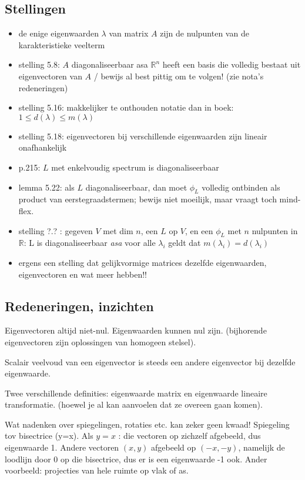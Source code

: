 \documentclass{article}
\begin{document}
\subsection{Stellingen}
\begin{itemize}
    \item de enige eigenwaarden $\lambda$ van matrix $A$ zijn de nulpunten van de karakteristieke veelterm
    \item stelling 5.8: $A$ diagonaliseerbaar asa $\mathbb{R}^n$ heeft een basis die volledig bestaat uit eigenvectoren van $A$ / bewijs al best pittig om te volgen! (zie nota's redeneringen) 
    \item stelling 5.16: makkelijker te onthouden notatie dan in boek:   $1 \leq d(\lambda) \leq m(\lambda)$
    \item stelling 5.18: eigenvectoren bij verschillende eigenwaarden zijn lineair onafhankelijk 
    \item p.215: $L$ met enkelvoudig spectrum is diagonaliseerbaar
    \item lemma 5.22: als $L$ diagonaliseerbaar, dan moet $\phi_L$ volledig ontbinden als product van eerstegraadstermen; bewijs niet moeilijk, maar vraagt toch mind-flex. 
    \item stelling ?.? : gegeven $V$ met dim $n$, een $L$ op $V$, en een $\phi_L$ met $n$ nulpunten in $\mathbb{R}$: L is diagonaliseerbaar \emph{asa} voor alle $\lambda_i$ geldt dat $m(\lambda_i) = d(\lambda_i) $
    \item ergens een stelling dat gelijkvormige matrices dezelfde eigenwaarden, eigenvectoren en wat meer hebben!! 
\end{itemize}

\subsection{Redeneringen, inzichten}

Eigenvectoren altijd niet-nul. Eigenwaarden kunnen nul zijn. (bijhorende eigenvectoren zijn oplossingen van homogeen stelsel). 

Scalair veelvoud van een eigenvector is steeds een andere eigenvector bij dezelfde eigenwaarde. 

Twee verschillende definities: eigenwaarde matrix en eigenwaarde lineaire transformatie. (hoewel je al kan aanvoelen dat ze overeen gaan komen). 

Wat nadenken over spiegelingen, rotaties etc. kan zeker geen kwaad! Spiegeling tov bisectrice (y=x). Als $y=x$ : die vectoren op zichzelf afgebeeld, dus eigenwaarde 1. Andere vectoren $(x,y)$ afgebeeld op $(-x,-y)$, namelijk de loodlijn door 0 op die bisectrice, dus er is een eigenwaarde -1 ook. Ander voorbeeld: projecties van hele ruimte op vlak of as. 
\end{document}
